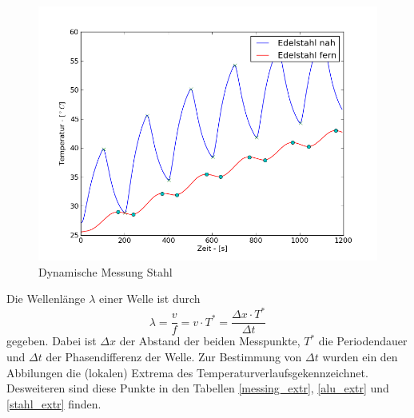 \documentclass[11pt]{article}
\begin{document}
\begin{figure}[P]
\centering
\includegraphics[width=\textwidth]{Diagramme/dyn_stahl.png}
\caption{Dynamische Messung Stahl}
\label{dyn_stahl}
\end{figure}\noindent
Die Wellenl\"ange $\lambda$ einer Welle ist durch
\begin{equation}
\label{wl}
\lambda = \frac{v}{f} = v\cdot T^* = \frac{\Delta x\cdot  T^* }{\Delta t}
\end{equation}
gegeben. Dabei ist $\Delta x$ der Abstand der beiden Messpunkte, $T^*$ die Periodendauer und $\Delta t$ der Phasendifferenz der Welle. Zur Bestimmung von $\Delta t$ wurden ein den Abbilungen die (lokalen) Extrema des Temperaturverlaufsgekennzeichnet. Desweiteren sind diese Punkte in den Tabellen \ref{messing_extr}, \ref{alu_extr} und \ref{stahl_extr} finden.
\end{document}

